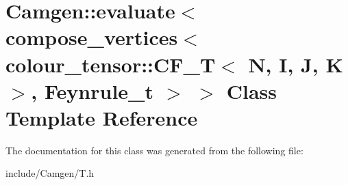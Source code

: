 \hypertarget{a00162}{}\section{Camgen\+:\+:evaluate$<$ compose\+\_\+vertices$<$ colour\+\_\+tensor\+:\+:C\+F\+\_\+\+T$<$ N, I, J, K $>$, Feynrule\+\_\+t $>$ $>$ Class Template Reference}
\label{a00162}


The documentation for this class was generated from the following file\+:\begin{DoxyCompactItemize}
\item 
include/\+Camgen/T.\+h\end{DoxyCompactItemize}
